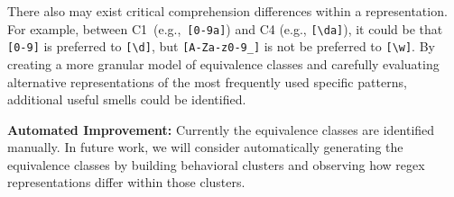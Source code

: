 There also may exist critical comprehension differences within a representation. For example, between C1~(e.g.,~\verb![0-9a]!) and C4 (e.g., \verb![\da]!), it could be that \verb![0-9]! is preferred to \verb![\d]!, but \verb![A-Za-z0-9_]! is not be preferred to \verb![\w]!.
By creating a more granular model of equivalence classes and carefully evaluating alternative representations of the most frequently used specific patterns, additional useful smells could be identified.

\noindent \textbf{Automated Improvement:}
Currently the equivalence classes are identified manually. In future work, we  will consider automatically generating the equivalence classes by building behavioral clusters and observing how regex representations differ within those clusters. %

\iffalse
\noindent \textbf{Community-specific Comprehension:}
A straightforward way to assess understandability is to directly ask software professionals which regexes they prefer and why.
In our evaluation, we did not focus on a specific community or a specific regex purpose (e.g., validating e-mail address, validating IP-address, parsing URLs).
 If an understandability study used regexes sampled from the codebase of a specific community (e.g., most frequently observed regexes, most buggy regexes, regexes on the hottest execution paths, etc.), and measured the understanding of programming professionals working in that community, then the measurements and the refactoring they imply would be more likely to have a direct impact.
 \fi
%

